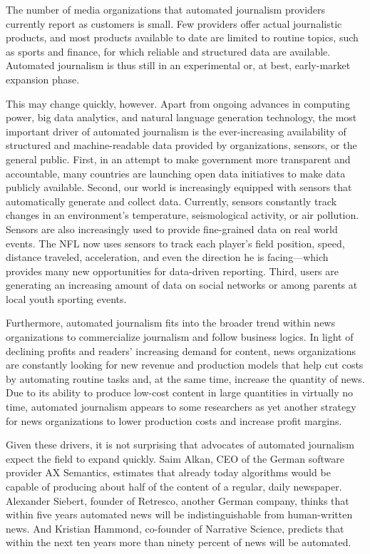 \documentclass[notoc, symmetric, nobib, nols]{towcenter-book}
\begin{document}
The number of media organizations that automated journalism providers currently report as customers is small. Few providers offer actual journalistic products, and most products available to date are limited to routine topics, such as sports and finance, for which reliable and structured data are available. Automated journalism is thus still in an experimental or, at best, early-market expansion phase.\cite{doerr15}

This may change quickly, however. Apart from ongoing advances in computing power, big data analytics, and natural language generation technology, the most important driver of automated journalism is the ever-increasing availability of structured and machine-readable data provided by organizations, sensors, or the general public. First, in an attempt to make government more transparent and accountable, many countries are launching open data initiatives to make data publicly available. Second, our world is increasingly equipped with sensors that automatically generate and collect data. Currently, sensors constantly track changes in an environment’s temperature, seismological activity, or air pollution. Sensors are also increasingly used to provide fine-grained data on real world events. The NFL now uses sensors to track each player’s field position, speed, distance traveled, acceleration, and even the direction he is facing---which provides many new opportunities for data-driven reporting. Third, users are generating an increasing amount of data on social networks or among parents at local youth sporting events. 

Furthermore, automated journalism fits into the broader trend within news organizations to commercialize journalism and follow business logics. In light of declining profits and readers’ increasing demand for content, news organizations are constantly looking for new revenue and production models that help cut costs by automating routine tasks and, at the same time, increase the quantity of news. Due to its ability to produce low-cost content in large quantities in virtually no time, automated journalism appears to some researchers as yet another strategy for news organizations to lower production costs and increase profit margins.\cite{cohen15}

Given these drivers, it is not surprising that advocates of automated journalism expect the field to expand quickly. Saim Alkan, CEO of the German software provider AX Semantics, estimates that already today algorithms would be capable of producing about half of the content of a regular, daily newspaper. Alexander Siebert, founder of Retresco, another German company, thinks that within five years automated news will be indistinguishable from human-written news.\cite{sie14} And Kristian Hammond, co-founder of Narrative Science, predicts that within the next ten years more than ninety percent of news will be automated.\cite{levy12} 
\end{document}
